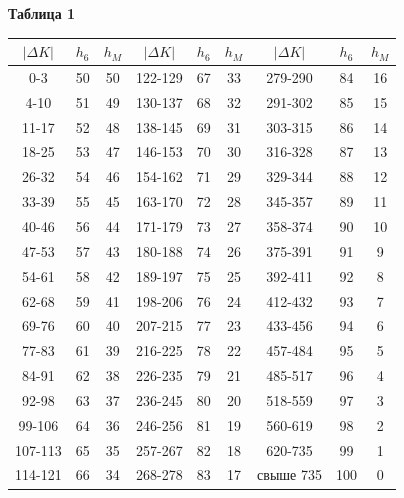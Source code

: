     \begin{table}
    \hspace{393 pt}
    \bf{Таблица 1}
    \begin{center}
    \begin{tabular}{|*{9}{c|}} \hline
    $|\Delta K|$ & $h_6$ & $h_M$ & $|\Delta K|$ & $h_6$ & $h_M$ & $|\Delta K|$ & $h_6$ & $h_M$ 
    \\ \hline 
    0-3 & 50 & 50 & 122-129 & 67 & 33 & 279-290 & 84 & 16 \\ \hline
    4-10 & 51 & 49 & 130-137 & 68 & 32 & 291-302 & 85 & 15 \\ \hline
    11-17 & 52 & 48 & 138-145 & 69 & 31 & 303-315 & 86 & 14 \\
    18-25 & 53 & 47 & 146-153 & 70 & 30 & 316-328 & 87 & 13 \\
    26-32 & 54 & 46 & 154-162 & 71 & 29 & 329-344 & 88 & 12 \\
    33-39 & 55 & 45 & 163-170 & 72 & 28 & 345-357 & 89 & 11 \\
    40-46 & 56 & 44 & 171-179 & 73 & 27 & 358-374 & 90 & 10 \\
    47-53 & 57 & 43 & 180-188 & 74 & 26 & 375-391 & 91 & 9 \\
    54-61 & 58 & 42 & 189-197 & 75 & 25 & 392-411 & 92 & 8 \\
    62-68 & 59 & 41 & 198-206 & 76 & 24 & 412-432 & 93 & 7 \\
    69-76 & 60 & 40 & 207-215 & 77 & 23 & 433-456 & 94 & 6 \\
    77-83 & 61 & 39 & 216-225 & 78 & 22 & 457-484 & 95 & 5 \\
    84-91 & 62 & 38 & 226-235 & 79 & 21 & 485-517 & 96 & 4 \\
    92-98 & 63 & 37 & 236-245 & 80 & 20 & 518-559 & 97 & 3 \\
    99-106 & 64 & 36 & 246-256 & 81 & 19 & 560-619 & 98 & 2 \\
    107-113 & 65 & 35 & 257-267 & 82 & 18 & 620-735 & 99 & 1 \\
    114-121 & 66 & 34 & 268-278 & 83 & 17 & свыше 735 & 100 & 0
    \\ \hline 
    \end{tabular}
    \end{center}
    \end{table}


